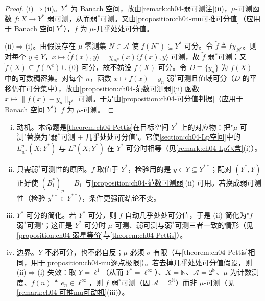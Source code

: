 \documentclass[../../main.tex]{subfiles}%
\begin{document}
\begin{proof}
(i)$\Rightarrow$(ii)。$Y^*$ 为 Banach 空间，故由\cref{remark:ch04-弱可测注}(ii)，$\mu$-可测函数 $f:X\to Y^*$ 弱可测，从而弱$^*$可测。又由\cref{proposition:ch04-mu可推可分值}（应用于 Banach 空间 $Y^*$），$f$ 为 $\mu$-几乎处处可分值。

(ii)$\Rightarrow$(i)。由假设存在 $\mu$-零测集 $N\in\mathcal{A}$ 使 $f(N^c)\subseteq Y^*$ 可分。令 $\tilde f\triangleq f\chi_{N^c}$。则对每个 $y\in Y$，$x\mapsto\langle\tilde f(x),y\rangle=\chi_{N^c}(x)\langle f(x),y\rangle$ 可测，故 $\tilde f$ 弱$^*$可测；又 $\tilde f(X)\subseteq f(N^c)\cup\{0\}$ 可分，故不妨设 $f(X)$ 可分。令 $D\equiv\{y_n\}$ 为 $f(X)$ 中的可数稠密集。对每个 $n$，函数 $x\mapsto f(x)-y_n$ 弱$^*$可测且值域可分（$D$ 的平移仍在可分集中），故由\cref{proposition:ch04-范数可测弱}(ii) 函数 $x\mapsto\|f(x)-y_n\|_{Y^*}$ 可测。于是由\cref{proposition:ch04-可分值判据}（应用于 Banach 空间 $Y^*$）$f$ 为 $\mu$-可测。
\end{proof}

\begin{remark}\label{remark:ch04-弱星等价动机}
\begin{enumerate}[(i)]
\item 动机。本命题是\cref{theorem:ch04-Pettis}在目标空间 $Y^*$ 上的对应物：把"$\mu$-可测"替换为"弱$^*$可测 $+$ 几乎处处可分值"。它使\cref{section:ch04-Lp空间}中的 $L^p_{w^*}(X;Y^*)$ 与 $L^p(X;Y^*)$ 在 $Y^*$ 可分时相等（见\cref{remark:ch04-Lp包含}(i)）。
\item 只需弱$^*$可测性的原因。$f$ 取值于 $Y^*$，检验用的是 $y\in Y\subseteq Y^{**}$；配对 $(Y^*,Y)$ 正好使 $(B_1^*)_p=B_1$ 与\cref{proposition:ch04-范数可测弱}(ii) 可用。若换成弱可测性（检验 $y^{**}\in Y^{**}$），条件更强而结论不变。
\item $Y^*$ 可分的简化。若 $Y^*$ 可分，则 $f$ 自动几乎处处可分值，于是 (ii) 简化为"$f$ 弱$^*$可测"；这正是 $Y^*$ 可分时 $\mu$-可测、弱可测与弱$^*$可测三者一致的情形（见\cref{proposition:ch04-弱星等价}与\cref{theorem:ch04-Pettis}）。
\item 边界。$Y$ 不必可分，也不必自反；$\mu$ 必须 $\sigma$-有限（与\cref{theorem:ch04-Pettis}相同，用于\cref{proposition:ch04-mu逐点极限}）。若去掉几乎处处可分值假设，则 (ii)$\Rightarrow$(i) 失效：取 $Y=\ell^1$（从而 $Y^*=\ell^\infty$）、$X=\mathbb{N}$、$\mathcal{A}=2^{\mathbb{N}}$、$\mu$ 为计数测度、$f(n)\triangleq e_n\in\ell^\infty$，则 $f$ 弱$^*$可测（因 $\mathcal{A}=2^{\mathbb{N}}$）而非 $\mu$-可测（见\cref{remark:ch04-可推mu可动机}(iii)）。
\end{enumerate}
\end{remark}
\end{document}
